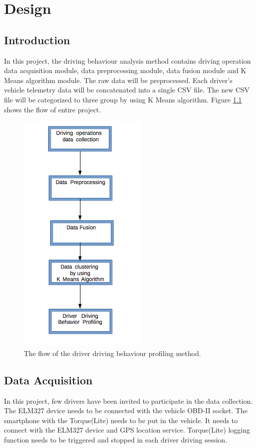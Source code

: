 \chapter{Design}
\section{Introduction}
In this project, the driving behaviour analysis method contains driving operation data acquisition module, data preprocessing module, data fusion module and K Means algorithm module. The raw data will be preprocessed. Each driver's vehicle telemetry data will be concatenated into a single CSV file. The new CSV file will be categorized to three group by using K Means algorithm. Figure \ref{fig:projectflow} shows the flow of entire project.

\begin{figure}[hbt!]\centering
\includegraphics[height=.4\textheight]{image/flowchart}
\caption{The flow of the driver driving behaviour profiling method. }
\label{fig:projectflow}
\end{figure}

\section{Data Acquisition}
In this project, few drivers have been invited to participate in the data collection. The ELM327 device needs to be connected with the vehicle OBD-II socket. The smartphone with the Torque(Lite) needs to be put in the vehicle. It needs to connect with the ELM327 device and GPS location service. Torque(Lite) logging function needs to be triggered and stopped in each driver driving session. 

